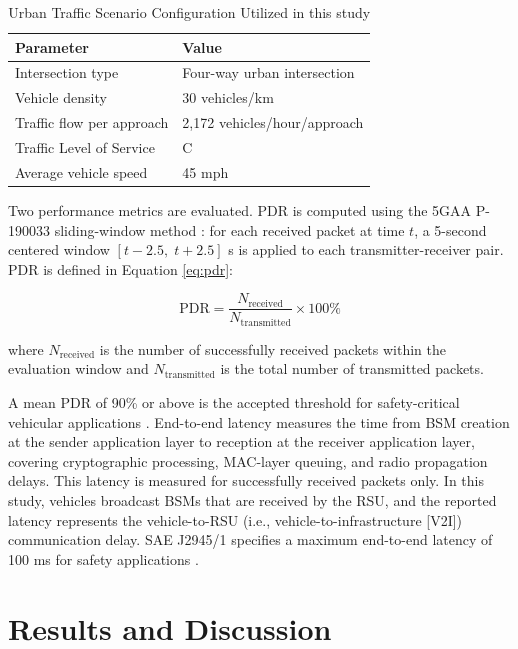 \documentclass[conference]{IEEEtran}
\begin{document}
\begin{table}[ht]
\centering
\caption{Urban Traffic Scenario Configuration Utilized in this study}
\label{tab:traffic_params}
\renewcommand{\arraystretch}{1.2}
\begin{tabular}{ll}
\hline
\textbf{Parameter} & \textbf{Value} \\
\hline
Intersection type & Four-way urban intersection \\
Vehicle density & 30 vehicles/km \\
Traffic flow per approach & 2{,}172 vehicles/hour/approach \\
Traffic Level of Service & C \cite{HCM2016} \\
Average vehicle speed & 45 mph \\
\hline
\end{tabular}
\end{table}

Two performance metrics are evaluated. PDR is computed using the 5GAA P-190033 sliding-window method \cite{5gaa_p190033}: for each received packet at time $t$, a 5-second centered window $[t-2.5,\;t+2.5]$ s is applied to each transmitter-receiver pair. PDR is defined in Equation \eqref{eq:pdr}:

\begin{equation}
\label{eq:pdr}
\mathrm{PDR} =
\frac{N_{\mathrm{received}}}
{N_{\mathrm{transmitted}}}
\times 100\%
\end{equation}

where $N_{\mathrm{received}}$ is the number of successfully received packets within the evaluation window and $N_{\mathrm{transmitted}}$ is the total number of transmitted packets.

A mean PDR of 90\% or above is the accepted threshold for safety-critical vehicular applications \cite{twardokus2025chasm}. End-to-end latency measures the time from BSM creation at the sender application layer to reception at the receiver application layer, covering cryptographic processing, MAC-layer queuing, and radio propagation delays. This latency is measured for successfully received packets only. In this study, vehicles broadcast BSMs that are received by the RSU, and the reported latency represents the vehicle-to-RSU (i.e., vehicle-to-infrastructure [V2I]) communication delay. SAE J2945/1 specifies a maximum end-to-end latency of 100 ms for safety applications \cite{sae_j29451}.

\section{Results and Discussion}
\end{document}
